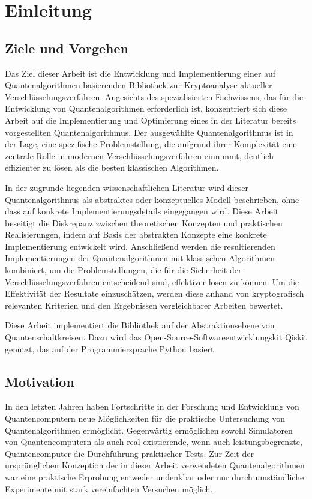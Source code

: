 \section{Einleitung}

\subsection{Ziele und Vorgehen}
Das Ziel dieser Arbeit ist die Entwicklung und Implementierung einer auf Quantenalgorithmen 
basierenden Bibliothek zur Kryptoanalyse aktueller Verschlüsselungsverfahren. 
Angesichts des spezialisierten Fachwissens, das für die Entwicklung von Quantenalgorithmen erforderlich ist, 
konzentriert sich diese Arbeit auf die Implementierung und Optimierung eines in der Literatur bereits vorgestellten Quantenalgorithmus.
Der ausgewählte Quantenalgorithmus ist in der Lage, eine spezifische Problemstellung, 
die aufgrund ihrer Komplexität eine zentrale Rolle in modernen Verschlüsselungsverfahren einnimmt, 
deutlich effizienter zu lösen als die besten klassischen Algorithmen.

In der zugrunde liegenden wissenschaftlichen Literatur wird dieser Quantenalgorithmus als abstraktes oder konzeptuelles Modell beschrieben, 
ohne dass auf konkrete Implementierungsdetails eingegangen wird. 
Diese Arbeit beseitigt die Diskrepanz zwischen theoretischen Konzepten und praktischen Realisierungen, 
indem auf Basis der abstrakten Konzepte eine konkrete Implementierung entwickelt wird.
Anschließend werden die resultierenden Implementierungen der Quantenalgorithmen mit klassischen Algorithmen kombiniert, 
um die Problemstellungen, die für die Sicherheit der Verschlüsselungsverfahren entscheidend sind, effektiver lösen zu können. 
Um die Effektivität der Resultate einzuschätzen, 
werden diese anhand von kryptografisch relevanten Kriterien und den Ergebnissen vergleichbarer Arbeiten bewertet.

Diese Arbeit implementiert die Bibliothek auf der Abstraktionsebene von Quantenschaltkreisen.
Dazu wird das Open-Source-Softwareentwicklungskit Qiskit genutzt, das auf der Programmiersprache Python basiert.

\subsection{Motivation}
In den letzten Jahren haben Fortschritte in der Forschung und Entwicklung von Quantencomputern neue Möglichkeiten für die praktische Untersuchung von Quantenalgorithmen ermöglicht.
Gegenwärtig ermöglichen sowohl Simulatoren von Quantencomputern als auch real existierende, wenn auch leistungsbegrenzte, Quantencomputer die Durchführung praktischer Tests.
Zur Zeit der ursprünglichen Konzeption der in dieser Arbeit verwendeten Quantenalgorithmen war eine praktische Erprobung entweder undenkbar oder nur durch umständliche Experimente mit stark vereinfachten Versuchen möglich.

